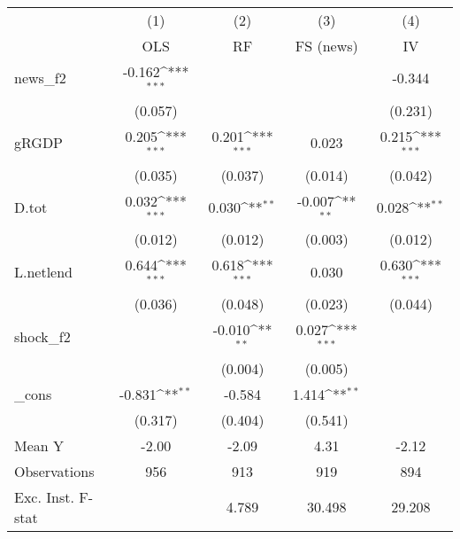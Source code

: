 {
\def\sym#1{\ifmmode^{#1}\else\(^{#1}\)\fi}
\begin{tabular}{l*{4}{c}}
\toprule
            &\multicolumn{1}{c}{(1)}&\multicolumn{1}{c}{(2)}&\multicolumn{1}{c}{(3)}&\multicolumn{1}{c}{(4)}\\
            &\multicolumn{1}{c}{OLS}&\multicolumn{1}{c}{RF}&\multicolumn{1}{c}{FS (news)}&\multicolumn{1}{c}{IV}\\
\midrule
news\_f2     &      -0.162\sym{***}&                     &                     &      -0.344         \\
            &     (0.057)         &                     &                     &     (0.231)         \\
\addlinespace
gRGDP       &       0.205\sym{***}&       0.201\sym{***}&       0.023         &       0.215\sym{***}\\
            &     (0.035)         &     (0.037)         &     (0.014)         &     (0.042)         \\
\addlinespace
D.tot       &       0.032\sym{***}&       0.030\sym{**} &      -0.007\sym{**} &       0.028\sym{**} \\
            &     (0.012)         &     (0.012)         &     (0.003)         &     (0.012)         \\
\addlinespace
L.netlend   &       0.644\sym{***}&       0.618\sym{***}&       0.030         &       0.630\sym{***}\\
            &     (0.036)         &     (0.048)         &     (0.023)         &     (0.044)         \\
\addlinespace
shock\_f2    &                     &      -0.010\sym{**} &       0.027\sym{***}&                     \\
            &                     &     (0.004)         &     (0.005)         &                     \\
\addlinespace
\_cons      &      -0.831\sym{**} &      -0.584         &       1.414\sym{**} &                     \\
            &     (0.317)         &     (0.404)         &     (0.541)         &                     \\
\midrule
Mean Y      &       -2.00         &       -2.09         &        4.31         &       -2.12         \\
Observations&         956         &         913         &         919         &         894         \\
Exc. Inst. F-stat&                     &       4.789         &      30.498         &      29.208         \\
\bottomrule
\end{tabular}
}
